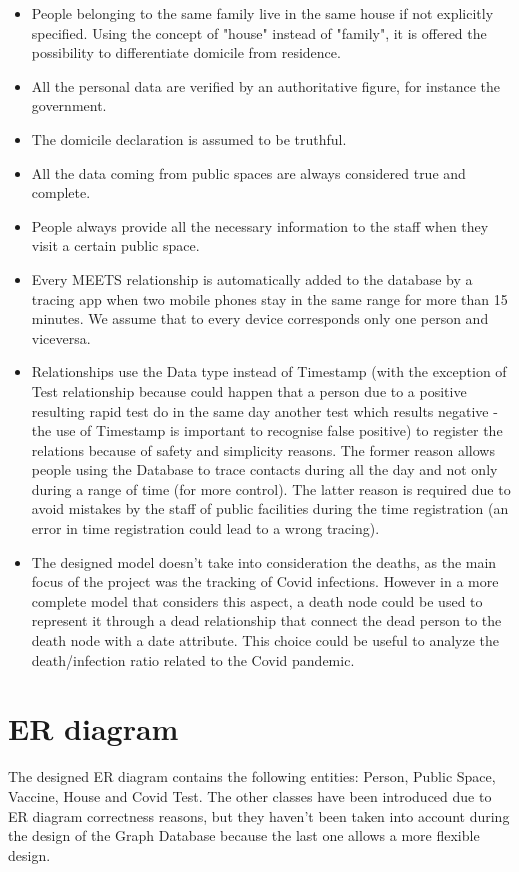 \documentclass{article}
\begin{document}
\begin{itemize}

\item People belonging to the same family live in the same house if not explicitly specified. Using the concept of "house" instead of "family", it is offered the possibility to differentiate domicile from residence.
\item All the personal data are verified by an authoritative figure, for instance the government.
\item The domicile declaration is assumed to be truthful.
\item All the data coming from public spaces are always considered true and complete.
\item People always provide all the necessary information to the staff when they visit a certain public space.
\item Every MEETS relationship is automatically added to the database by a tracing app when two mobile phones stay in the same range for more than 15 minutes. We assume that to every device corresponds only one person and viceversa.
\item Relationships use the Data type instead of Timestamp (with the exception of Test relationship because could happen that a person due to a positive resulting rapid test do in the same day another test which results negative - the use of Timestamp is important to recognise false positive) to register the relations because of safety and simplicity reasons. The former reason allows people using the Database to trace contacts during all the day and not only during a range of time (for more control). The latter reason is required due to avoid mistakes by the staff of public facilities during the time registration (an error in time registration could lead to a wrong tracing).
\item The designed model doesn't take into consideration the deaths, as the main focus of the project was the tracking of Covid infections. However in a more complete model that considers this aspect, a death node could be used to represent it through a dead relationship that connect the dead person to the death node with a date attribute. This choice could be useful to analyze the death/infection ratio related to the Covid pandemic.

\end{itemize}

\section{ER diagram}
The designed ER diagram contains the following entities: Person, Public Space, Vaccine, House and Covid Test. The other classes have been introduced due to ER diagram correctness reasons, but they haven't been taken into account during the design of the Graph Database because the last one allows a more flexible design. 
\end{document}
